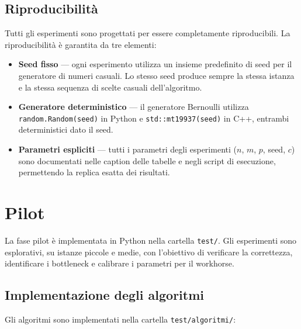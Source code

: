 \documentclass[12pt, a4paper]{article}
\begin{document}
\subsection*{Riproducibilit\`a}

Tutti gli esperimenti sono progettati per essere completamente 
riproducibili. La riproducibilit\`a \`e garantita da tre elementi:

\begin{itemize}
    \item \textbf{Seed fisso} — ogni esperimento utilizza un insieme 
    predefinito di seed per il generatore di numeri casuali. 
    Lo stesso seed produce sempre la stessa istanza e la stessa 
    sequenza di scelte casuali dell'algoritmo.

    \item \textbf{Generatore deterministico} — il generatore Bernoulli 
    utilizza \texttt{random.Random(seed)} in Python e 
    \texttt{std::mt19937(seed)} in C++, entrambi deterministici 
    dato il seed.

    \item \textbf{Parametri espliciti} — tutti i parametri degli 
    esperimenti ($n$, $m$, $p$, seed, $c$) sono documentati 
    nelle caption delle tabelle e negli script di esecuzione, 
    permettendo la replica esatta dei risultati.
\end{itemize}

\section{Pilot}
\label{sec:pilot}


La fase pilot \`e implementata in Python nella cartella \texttt{test/}.
Gli esperimenti sono esplorativi, su istanze piccole e medie, 
con l'obiettivo di verificare la correttezza, identificare i bottleneck
e calibrare i parametri per il workhorse.

\subsection{Implementazione degli algoritmi}

Gli algoritmi sono implementati nella cartella \texttt{test/algoritmi/}:
\end{document}
